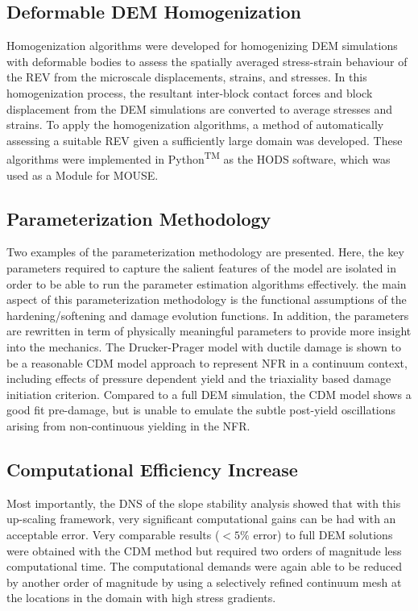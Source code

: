 \subsection*{Deformable DEM Homogenization}

Homogenization algorithms were developed for homogenizing DEM simulations with deformable bodies to assess the spatially averaged stress-strain behaviour of the REV from the microscale displacements, strains, and stresses. In this homogenization process, the resultant inter-block contact forces and block displacement from the DEM simulations are converted to average stresses and strains. To apply the homogenization algorithms, a method of automatically assessing a suitable REV given a sufficiently large domain was developed. These algorithms were implemented in Python\textsuperscript{TM} as the HODS software, which was used as a Module for MOUSE.

\subsection*{Parameterization Methodology}

Two examples of the parameterization methodology are presented. Here, the key parameters required to capture the salient features of the model are isolated in order to be able to run the parameter estimation algorithms effectively. the main aspect of this parameterization methodology is the functional assumptions of the hardening/softening and damage evolution functions. In addition, the parameters are rewritten in term of physically meaningful parameters to provide more insight into the mechanics. The Drucker-Prager model with ductile damage is shown to be a reasonable CDM model approach to represent NFR in a continuum context, including effects of pressure dependent yield and the triaxiality based damage initiation criterion. Compared to a full DEM simulation, the CDM model shows a good fit pre-damage, but is unable to emulate the subtle post-yield oscillations arising from non-continuous yielding in the NFR.

\subsection*{Computational Efficiency Increase}

Most importantly, the DNS of the slope stability analysis showed that with this up-scaling framework, very significant computational gains can be had with an acceptable error. Very comparable results ($<5\%$ error) to full DEM solutions were obtained with the CDM method but required two orders of magnitude less computational time. The computational demands were again able to be reduced by another order of magnitude by using a selectively refined continuum mesh at the locations in the domain with high stress gradients.

